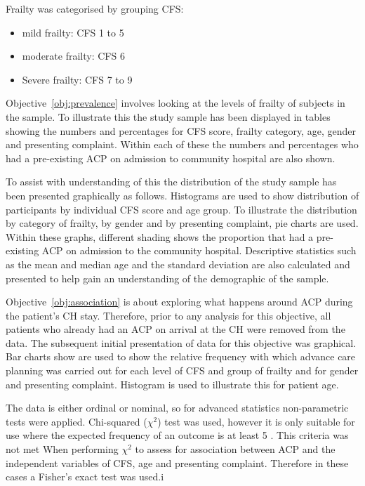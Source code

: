\documentclass
[
	12pt,
	a4paper,
	oneside,
]{report}
\begin{document}
Frailty was categorised by grouping CFS:
\begin{itemize}
\label{ref:cfs-grouping}
	\item mild frailty: CFS 1 to 5
	\item moderate frailty: CFS 6
	\item Severe frailty: CFS 7 to 9
\end{itemize}

Objective~\ref{obj:prevalence} involves looking at the levels of frailty of
subjects in the sample. To illustrate this the study sample has been 
displayed in tables showing the numbers and percentages for CFS score, 
frailty category, age, gender and presenting complaint. Within each
of these the numbers and percentages who had a pre-existing ACP
on admission to community hospital are also shown.

To assist with understanding of this the distribution of the study sample 
has been presented graphically as follows.
Histograms are used to show distribution of participants by individual 
CFS score and age group.  
To illustrate the distribution by category of frailty, by gender and by presenting 
complaint, pie charts are used. Within these graphs, different shading shows
the proportion that had a pre-existing ACP on admission to the community hospital.
Descriptive statistics such as the mean and median age and the standard deviation
are also calculated and presented to help gain an understanding of the 
demographic of the sample.

Objective~\ref{obj:association} is about exploring what happens around ACP
during the patient's CH stay. Therefore, prior to any analysis for this 
objective, all patients who already had an ACP on arrival at the CH were
removed from the data.
The subsequent initial presentation of data for this objective was
graphical. Bar charts show are used to show the relative frequency with which 
advance care planning
was carried out for each level of CFS and group of frailty and for gender and
presenting complaint. Histogram is used to illustrate this for patient age.

The data is either ordinal or nominal, so for advanced statistics
non-parametric tests were applied. Chi-squared ($\chi^2$) test was used, 
however it is only
suitable for use where the expected frequency of an outcome is at least 5
\parencite[page 690]{field:09}. This criteria was not met When performing 
$\chi^2$ to assess for association between ACP and the independent variables 
of CFS, age and presenting complaint. Therefore in these cases a Fisher's exact
test was used.i
\end{document}
